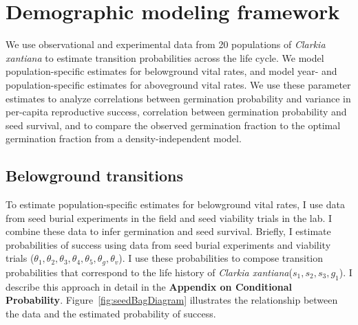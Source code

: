 \documentclass[12pt, oneside, titlepage]{article}   	%
\begin{document}

\section{Demographic modeling framework}

We use observational and experimental data from 20 populations of \textit{Clarkia xantiana} to estimate transition probabilities across the life cycle. We model population-specific estimates for belowground vital rates, and model year- and population-specific estimates for aboveground vital rates. We use these parameter estimates to analyze correlations between germination probability and variance in per-capita reproductive success, correlation between germination probability and seed survival, and to compare the observed germination fraction to the optimal germination fraction from a density-independent model. 

\subsection{Belowground transitions}

To estimate population-specific estimates for belowground vital rates, I use data from seed burial experiments in the field and seed viability trials in the lab. I combine these data to infer germination and seed survival. Briefly, I estimate probabilities of success using data from seed burial experiments and viability trials ($\theta_1, \theta_2, \theta_3, \theta_4, \theta_5, \theta_g, \theta_v$). I use these probabilities to compose transition probabilities that correspond to the life history of \textit{Clarkia xantiana}($s_1, s_2, s_3, g_1$). I describe this approach in detail in the \textbf{Appendix on Conditional Probability}. Figure~\ref{fig:seedBagDiagram} illustrates the relationship between the data and the estimated probability of success. 
 
\end{document}
